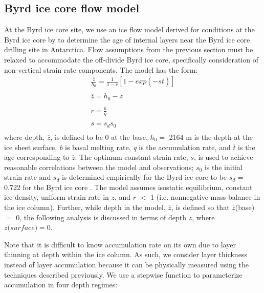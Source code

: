 \documentclass[12pt]{article}
\begin{document}
\subsection{Byrd ice core flow model}\label{byrdflow}
At the Byrd ice core site, we use an ice flow model derived for conditions at the Byrd ice core by \citet{morland2009} to determine the age of internal layers near the Byrd ice core drilling site in Antarctica. Flow assumptions from the previous section must be relaxed to accommodate the off-divide Byrd ice core, specifically consideration of non-vertical strain rate components. The \citet{morland2009} model has the form:
\begin{equation}
\begin{array}{l}
\displaystyle \frac{\overline{z}}{h_0} = \frac{1}{1 - r} [1 - exp(-s \overline{t})]\\
\\
\displaystyle \overline{z} = h_0 - z\\
\\
\displaystyle r = \frac{b}{q}\\
\\
\displaystyle s = s_ds_0\\
\end{array}
\end{equation}
where depth, $\overline{z}$, is defined to be 0 at the base, $h_0 =$ 2164 m is the depth at the ice sheet surface, \textit{b} is basal melting rate, \textit{q} is the accumulation rate, and $\overline{t}$ is the age corresponding to $\overline{z}$. The optimum constant strain rate, $\textit{s}$, is used to achieve reasonable correlations between the model and observations; $s_0$ is the initial strain rate and $s_d$ is determined empirically for the Byrd ice core to be $s_d$ = 0.722 for the Byrd ice core \citep{morland2009}. The model assumes isostatic equilibrium, constant ice density, uniform strain rate in $\textit{z}$, and $\textit{r}$ $<$ 1 (i.e. nonnegative mass balance in the ice column). Further, while depth in the model, $\overline{z}$, is defined so that $\overline{z}$(base) $=$ 0, the following analysis is discussed in terms of depth $\textit{z}$, where $\textit{z(surface)} = 0$.

Note that it is difficult to know accumulation rate on its own due to layer thinning at depth within the ice column. As such, we consider layer thickness instead of layer accumulation because it can be physically measured using the techniques described previously. We use a stepwise function to parameterize accumulation in four depth regimes:
\end{document}

